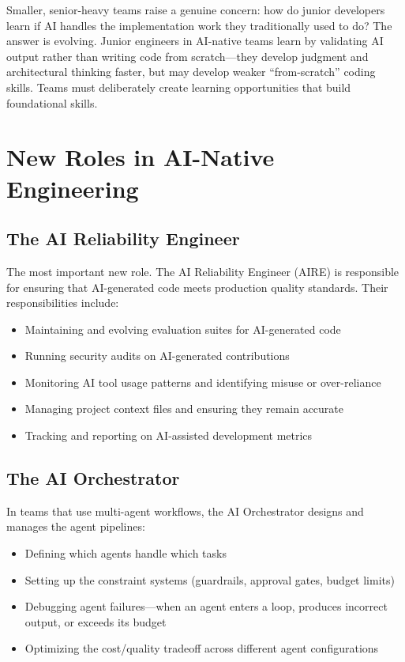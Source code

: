 \begin{cautionbox}
Smaller, senior-heavy teams raise a genuine concern: how do junior developers learn if AI handles the implementation work they traditionally used to do? The answer is evolving. Junior engineers in AI-native teams learn by validating AI output rather than writing code from scratch---they develop judgment and architectural thinking faster, but may develop weaker ``from-scratch'' coding skills. Teams must deliberately create learning opportunities that build foundational skills.
\end{cautionbox}


\section{New Roles in AI-Native Engineering}

\subsection{The AI Reliability Engineer}

The most important new role. The AI Reliability Engineer (AIRE) is responsible for ensuring that AI-generated code meets production quality standards. Their responsibilities include:

\begin{itemize}[leftmargin=*]
    \item Maintaining and evolving evaluation suites for AI-generated code
    \item Running security audits on AI-generated contributions
    \item Monitoring AI tool usage patterns and identifying misuse or over-reliance
    \item Managing project context files and ensuring they remain accurate
    \item Tracking and reporting on AI-assisted development metrics
\end{itemize}

\subsection{The AI Orchestrator}

In teams that use multi-agent workflows, the AI Orchestrator designs and manages the agent pipelines:

\begin{itemize}[leftmargin=*]
    \item Defining which agents handle which tasks
    \item Setting up the constraint systems (guardrails, approval gates, budget limits)
    \item Debugging agent failures---when an agent enters a loop, produces incorrect output, or exceeds its budget
    \item Optimizing the cost/quality tradeoff across different agent configurations
\end{itemize}

